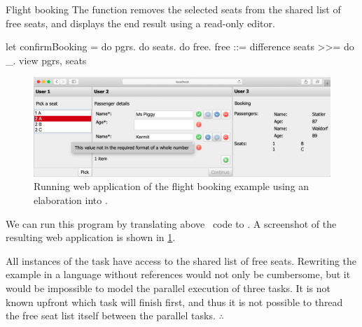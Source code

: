 \begin{example}{Flight booking}
  The function  removes the selected seats from the shared list of free seats,
  and displays the end result using a read-only editor.
  \begin{TASK}[emph={name,age,seats,pgrs,free}]
    let confirmBooking = do pgrs. do seats. do free.
      free ::= difference seats >>= do  _.
      view {pgrs, seats}
  \end{TASK}

  \begin{figure}
    \label{fig:flight-booking}
    \includegraphics[width=\columnwidth]{figures/flight-booking.png}
    \caption{Running web application of the flight booking example using an elaboration into \ITASKS.}
  \end{figure}

  We can run this program by translating above \TOPHAT\ code to \ITASKS.
  A screenshot of the resulting web application is shown in \cref{fig:flight-booking}.

  All instances of the  task have access to the shared list of free seats.
  Rewriting the example in a language without references would not only be cumbersome,
  but it would be impossible to model the parallel execution of three  tasks.
  It is not known upfront which task will finish first,
  and thus it is not possible to thread the free seat list itself between the parallel tasks.
\hfill$\therefore$\end{example}

